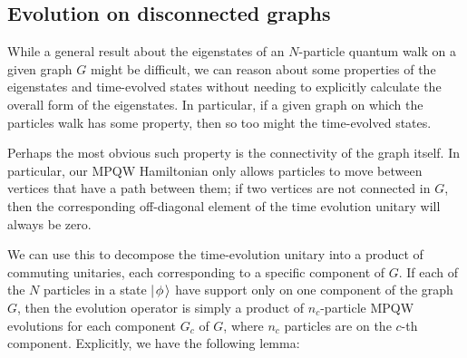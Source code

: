 \documentclass[../thesis-main/thesis-main]{subfiles}
\begin{document}
\subsection{Evolution on disconnected graphs}

While a general result about the eigenstates of an $N$-particle quantum walk on a given graph $G$ might be difficult, we can reason about some properties of the eigenstates and time-evolved states without needing to explicitly calculate the overall form of the eigenstates.  In particular, if a given graph on which the particles walk has some property, then so too might the time-evolved states.

Perhaps the most obvious such property is the connectivity of the graph itself.  In particular, our MPQW Hamiltonian  only allows particles to move between vertices that have a path between them; if two vertices are not connected in $G$, then the corresponding off-diagonal element of the time evolution unitary will always be zero.

We can use this to decompose the time-evolution unitary into a product of commuting unitaries, each corresponding to a specific component of $G$.  If each of the $N$ particles in a state $|\mspace{2mu} \phi \mspace{2mu} \rangle$ have support only on one component of the graph $G$, then the evolution operator is simply a product of $n_c$-particle MPQW evolutions for each component $G_c$ of $G$, where $n_c$ particles are on the $c$-th component.  Explicitly, we have the following lemma:
\end{document}
